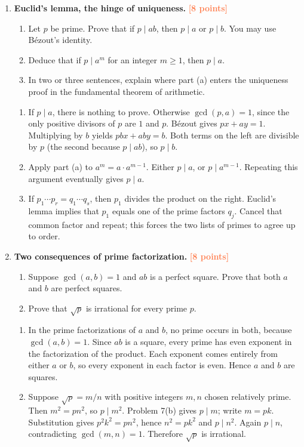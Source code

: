 \documentclass[11pt]{article}
\newcommand{\divides}{\mid}
\newcommand{\points}[1]{\hfill\textcolor{coral}{\small\bfseries[#1 points]}}
\begin{document}
\begin{enumerate}[resume]
\item \textbf{Euclid's lemma, the hinge of uniqueness.} \points{8}
\begin{enumerate}
  \item Let $p$ be prime. Prove that if $p\divides ab$, then
  $p\divides a$ or $p\divides b$. You may use B\'ezout's identity.
  \item Deduce that if $p\divides a^m$ for an integer $m\ge1$, then
  $p\divides a$.
  \item In two or three sentences, explain where part (a) enters the uniqueness
  proof in the fundamental theorem of arithmetic.
\end{enumerate}
\begin{solution}
\begin{enumerate}
  \item If $p\divides a$, there is nothing to prove. Otherwise
  $\gcd(p,a)=1$, since the only positive divisors of $p$ are $1$ and $p$.
  B\'ezout gives $px+ay=1$. Multiplying by $b$ yields
  $pbx+aby=b$. Both terms on the left are divisible by $p$ (the second because
  $p\divides ab$), so $p\divides b$.
  \item Apply part (a) to $a^m=a\cdot a^{m-1}$. Either $p\divides a$, or
  $p\divides a^{m-1}$. Repeating this argument eventually gives
  $p\divides a$.
  \item If $p_1\cdots p_r=q_1\cdots q_s$, then $p_1$ divides the product on
  the right. Euclid's lemma implies that $p_1$ equals one of the prime factors
  $q_j$. Cancel that common factor and repeat; this forces the two lists of
  primes to agree up to order.
\end{enumerate}
\end{solution}

\item \textbf{Two consequences of prime factorization.} \points{8}
\begin{enumerate}
  \item Suppose $\gcd(a,b)=1$ and $ab$ is a perfect square. Prove that both
  $a$ and $b$ are perfect squares.
  \item Prove that $\sqrt p$ is irrational for every prime $p$.
\end{enumerate}
\begin{solution}
\begin{enumerate}
  \item In the prime factorizations of $a$ and $b$, no prime occurs in both,
  because $\gcd(a,b)=1$. Since $ab$ is a square, every prime has even exponent
  in the factorization of the product. Each exponent comes entirely from
  either $a$ or $b$, so every exponent in each factor is even. Hence $a$ and
  $b$ are squares.
  \item Suppose $\sqrt p=m/n$ with positive integers $m,n$ chosen relatively
  prime. Then $m^2=pn^2$, so $p\divides m^2$. Problem 7(b) gives
  $p\divides m$; write $m=pk$. Substitution gives $p^2k^2=pn^2$, hence
  $n^2=pk^2$ and $p\divides n^2$. Again $p\divides n$, contradicting
  $\gcd(m,n)=1$. Therefore $\sqrt p$ is irrational.
\end{enumerate}
\end{solution}


\end{enumerate}
\end{document}

